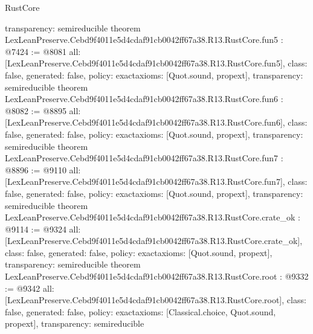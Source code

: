 \begin{lexlean}{RustCore}
\begin{coremodule}
{  transparency: semireducible
}
theorem LexLeanPreserve.Cebd9f4011e5d4cdaf91cb0042ff67a38.R13.RustCore.fun5 : @7424 := @8081 {
  all: [LexLeanPreserve.Cebd9f4011e5d4cdaf91cb0042ff67a38.R13.RustCore.fun5],
  class: false,
  generated: false,
  policy: exact{axioms: [Quot.sound, propext]},
  transparency: semireducible
}
theorem LexLeanPreserve.Cebd9f4011e5d4cdaf91cb0042ff67a38.R13.RustCore.fun6 : @8082 := @8895 {
  all: [LexLeanPreserve.Cebd9f4011e5d4cdaf91cb0042ff67a38.R13.RustCore.fun6],
  class: false,
  generated: false,
  policy: exact{axioms: [Quot.sound, propext]},
  transparency: semireducible
}
theorem LexLeanPreserve.Cebd9f4011e5d4cdaf91cb0042ff67a38.R13.RustCore.fun7 : @8896 := @9110 {
  all: [LexLeanPreserve.Cebd9f4011e5d4cdaf91cb0042ff67a38.R13.RustCore.fun7],
  class: false,
  generated: false,
  policy: exact{axioms: [Quot.sound, propext]},
  transparency: semireducible
}
theorem LexLeanPreserve.Cebd9f4011e5d4cdaf91cb0042ff67a38.R13.RustCore.crate_ok : @9114 := @9324 {
  all: [LexLeanPreserve.Cebd9f4011e5d4cdaf91cb0042ff67a38.R13.RustCore.crate_ok],
  class: false,
  generated: false,
  policy: exact{axioms: [Quot.sound, propext]},
  transparency: semireducible
}
theorem LexLeanPreserve.Cebd9f4011e5d4cdaf91cb0042ff67a38.R13.RustCore.root : @9332 := @9342 {
  all: [LexLeanPreserve.Cebd9f4011e5d4cdaf91cb0042ff67a38.R13.RustCore.root],
  class: false,
  generated: false,
  policy: exact{axioms: [Classical.choice, Quot.sound, propext]},
  transparency: semireducible
}


\end{coremodule}
\end{lexlean}
